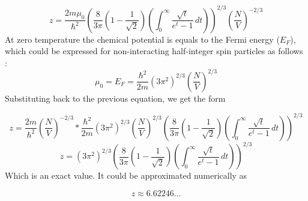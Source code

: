 \begin{equation} \label{eq:23}
z
=
\frac{2m \mu_{0}}{\hbar^{2}}
\left(
\frac{8}{3 \pi} \left( 1 - \frac{1}{\sqrt{2}} \right) \left( \int_{0}^{\infty} \frac{\sqrt{t}}{e^{t} - 1}\,dt \right)
\right)^{2/3}
\left( \frac{N}{V} \right)^{-2/3}
\end{equation}
At zero temperature the chemical potential is equals to the Fermi energy ($E_{F}$), which could be expressed for non-interacting half-integer spin particles as follows \citep{Glyde2014}:
\begin{equation}
\mu_{0}
=
E_{F}
=
\frac{\hbar^{2}}{2m} \left( 3 \pi^{2} \right)^{2/3} \left( \frac{N}{V} \right)^{2/3}
\end{equation}
Substituting back to the previous equation, we get the form

\begin{equation}
z
=
\frac{2m}{\hbar^{2}} \left( \frac{N}{V} \right)^{-2/3} * \frac{\hbar^{2}}{2m} \left( 3 \pi^{2} \right)^{2/3} \left( \frac{N}{V} \right)^{2/3}
\left(
\frac{8}{3 \pi} \left( 1 - \frac{1}{\sqrt{2}} \right) \left( \int_{0}^{\infty} \frac{\sqrt{t}}{e^{t} - 1}\,dt \right)
\right)^{2/3}
\end{equation}
\begin{equation}
z
=
\left( 3 \pi^{2} \right)^{2/3}
\left(
\frac{8}{3 \pi} \left( 1 - \frac{1}{\sqrt{2}} \right) \left( \int_{0}^{\infty} \frac{\sqrt{t}}{e^{t} - 1}\,dt \right)
\right)^{2/3}
\end{equation}
Which is an exact value. It could be approximated numerically as

\begin{equation}
z
\approx
6.62246...
\end{equation}